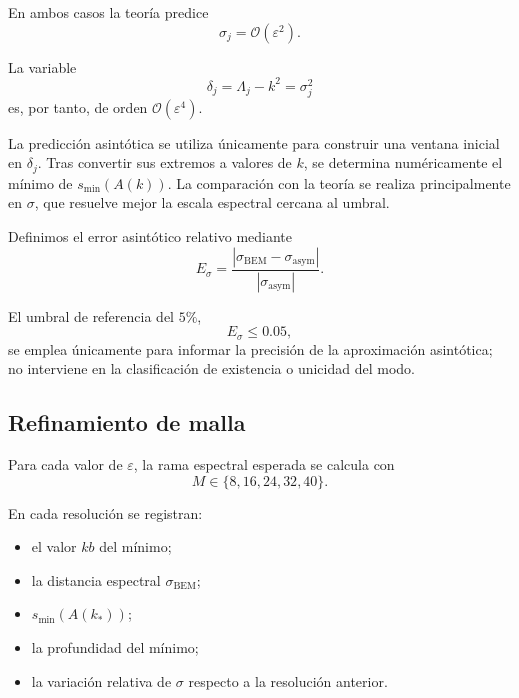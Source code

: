 \documentclass[11pt]{article}
\begin{document}
En ambos casos la teoría predice
\[
\sigma_j=\mathcal{O}(\varepsilon^2).
\]

La variable
\begin{equation}
\delta_j
=
\Lambda_j-k^2
=
\sigma_j^2
\end{equation}
es, por tanto, de orden
\(\mathcal{O}(\varepsilon^4)\).

La predicción asintótica se utiliza únicamente para construir una ventana inicial en \(\delta_j\). Tras convertir sus extremos a valores de \(k\), se determina numéricamente el mínimo de \(s_{\min}(A(k))\). La comparación con la teoría se realiza principalmente en \(\sigma\), que resuelve mejor la escala espectral cercana al umbral.

Definimos el error asintótico relativo mediante
\begin{equation}
E_\sigma
=
\frac{
\left|
\sigma_{\mathrm{BEM}}
-
\sigma_{\mathrm{asym}}
\right|
}{
\left|
\sigma_{\mathrm{asym}}
\right|
}.
\label{eq:sigma_error}
\end{equation}

El umbral de referencia del \(5\%\),
\begin{equation}
E_\sigma\leq0.05,
\end{equation}
se emplea únicamente para informar la precisión de la aproximación asintótica; no interviene en la clasificación de existencia o unicidad del modo.

\subsection{Refinamiento de malla}

Para cada valor de \(\varepsilon\), la rama espectral esperada se calcula con
\begin{equation}
M\in\{8,16,24,32,40\}.
\label{eq:mesh_sequence}
\end{equation}

En cada resolución se registran:

\begin{itemize}
    \item el valor \(kb\) del mínimo;
    \item la distancia espectral \(\sigma_{\mathrm{BEM}}\);
    \item \(s_{\min}(A(k_*))\);
    \item la profundidad del mínimo;
    \item la variación relativa de \(\sigma\) respecto a la resolución anterior.
\end{itemize}
\end{document}
